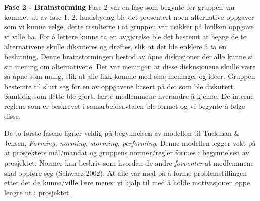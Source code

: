 \begin{adjustwidth}{2.5cm}{0cm}
\begin{figure}
\end{figure}

\noindent \textbf{\Large Fase 2 - Brainstorming}
Fase 2 var en fase som begynte før gruppen var kommet ut av fase 1. 
2. landsbydag ble det presentert noen alternative oppgaver som vi kunne velge, dette resulterte i at gruppen var usikker på hvilken oppgave vi ville ha. 
For å lettere kunne ta en avgjørelse ble det bestemt at begge de to alternativene skulle diksuteres og drøftes, slik at det ble enklere å ta en beslutning. 
Denne brainstormingen bestod av åpne diskusjoner der alle kunne si sin mening om alternativene. 
Det var meningen at disse diskusjonene skulle være så åpne som mulig, slik at alle fikk komme med sine meninger og ideer. 
Gruppen bestemte til slutt seg for en av oppgavene basert på det som ble diskutert. 
Samtidig som dette ble gjort, lærte medlemmene hverandre å kjenne. 
De interne reglene som er beskrevet i samarbeidsavtalen ble formet og vi begynte å følge disse. 

De to første fasene ligner veldig på begynnelsen av modellen til Tuckman \& Jensen, \textit{Forming, norming, storming, performing}. 
Denne modellen legger vekt på at prosjektets mål/mandat og gruppens normer/regler formes i begynnelsen av prosjektet. 
Normer kan beskriv som hvordan de andre \textit{forventer} at medlemmene skal oppføre seg (Schwarz 2002). 
At alle var med på å forme problemstillingen etter det de kunne/ville lære mener vi hjalp til med å holde motivasjonen oppe lengre ut i prosjektet. 
\vspace{\secspace}


\end{adjustwidth}
